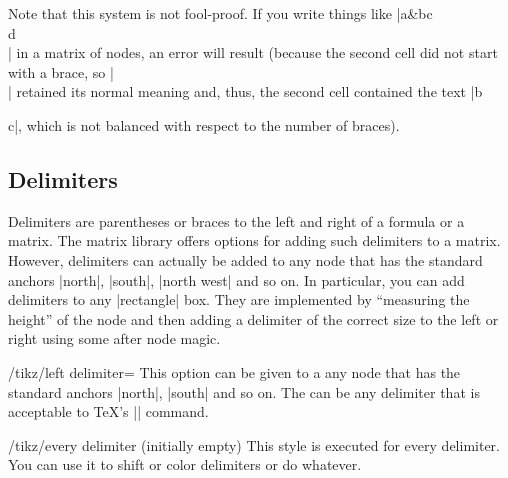 Note that this system is not fool-proof. If you write things like |a&b{c\\d}\\|
in a matrix of nodes, an error will result (because the second cell did not
start with a brace, so |\\| retained its normal meaning and, thus, the second
cell contained the text |b{c|, which is not balanced with respect to the number
of braces).


\subsection{Delimiters}

Delimiters are parentheses or braces to the left and right of a formula or a
matrix. The matrix library offers options for adding such delimiters to a
matrix. However, delimiters can actually be added to any node that has the
standard anchors |north|, |south|, |north west| and so on. In particular, you
can add delimiters to any |rectangle| box. They are implemented by ``measuring
the height'' of the node and then adding a delimiter of the correct size to the
left or right using some after node magic.

\begin{key}{/tikz/left delimiter=}
    This option can be given to a any node that has the standard anchors
    |north|, |south| and so on. The  can be any delimiter that
    is acceptable to \TeX's |\left| command.
\begin{codeexample}[preamble={\usetikzlibrary{matrix}}]
\end{codeexample}

\begin{codeexample}[preamble={\usetikzlibrary{matrix}}]
\end{codeexample}

    \begin{stylekey}{/tikz/every delimiter (initially \normalfont empty)}
        This style is executed for every delimiter. You can use it to shift or
        color delimiters or do whatever.
    \end{stylekey}


\end{key}}
